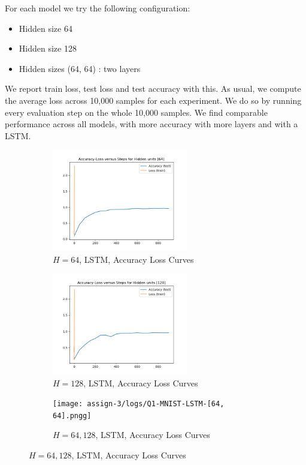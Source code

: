 For each model we try the following configuration:
\begin{itemize}
\item  Hidden size 64
\item Hidden size 128
\item Hidden sizes (64, 64) : two layers
\end{itemize}

We report train loss, test loss and test accuracy with this. As usual, we compute the average loss across 10,000 samples for each experiment. We do so by running every evaluation step on the whole 10,000 samples. We find comparable performance across all models, with more accuracy with more layers and with a LSTM.

\begin{figure}[!htbp]
\begin{subfigure}
\centering
\includegraphics[angle=0,width=0.65\textwidth]{assign-3/logs/Q1-MNIST-LSTM-[64].png}
\caption{$H=64$, LSTM, Accuracy Loss Curves}
\end{subfigure}
\begin{subfigure}
\centering
\includegraphics[angle=0,width=0.65\textwidth]{assign-3/logs/Q1-MNIST-LSTM-[128].png}
\caption{$H=128$, LSTM, Accuracy Loss Curves}
\end{subfigure}
\begin{subfigure}
\centering
\texttt{[image: assign-3/logs/Q1-MNIST-LSTM-[64, 64].pngg]}
\caption{$H=64, 128$, LSTM, Accuracy Loss Curves}
\end{subfigure}
\end{figure}
